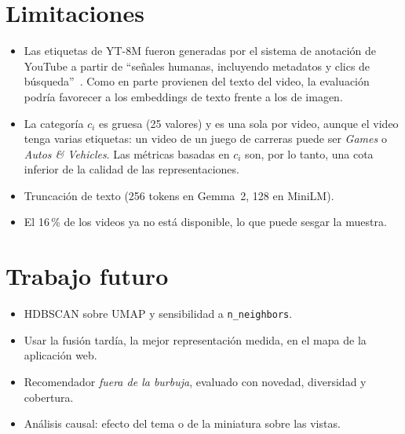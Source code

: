 \documentclass[11pt,a4paper]{article}
\begin{document}
\section{Limitaciones}
\begin{itemize}
  \item Las etiquetas de YT-8M fueron generadas por el sistema de anotación de YouTube a partir
        de ``señales humanas, incluyendo metadatos y clics de búsqueda''~\cite{yt8m}. Como en parte
        provienen del texto del video, la evaluación podría favorecer a los embeddings de texto
        frente a los de imagen.
  \item La categoría $c_i$ es gruesa (25 valores) y es una sola por video, aunque el video tenga
        varias etiquetas: un video de un juego de carreras puede ser \emph{Games} o
        \emph{Autos \& Vehicles}. Las métricas basadas en $c_i$ son, por lo tanto, una cota
        inferior de la calidad de las representaciones.
  \item Truncación de texto (256 tokens en Gemma~2, 128 en MiniLM).
  \item El 16\,\% de los videos ya no está disponible, lo que puede sesgar la muestra.
\end{itemize}

\section{Trabajo futuro}
\begin{itemize}
  \item HDBSCAN sobre UMAP y sensibilidad a \texttt{n\_neighbors}.
  \item Usar la fusión tardía, la mejor representación medida, en el mapa de la aplicación web.
  \item Recomendador \emph{fuera de la burbuja}, evaluado con novedad, diversidad y cobertura.
  \item Análisis causal: efecto del tema o de la miniatura sobre las vistas.
\end{itemize}
\end{document}
